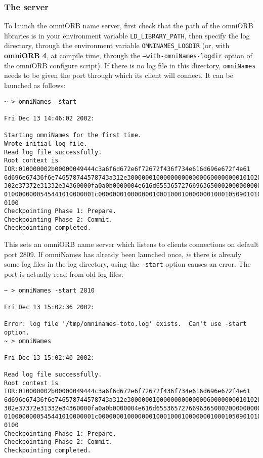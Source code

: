 \subsubsection{The server}

To launch the omniORB name server, first check that the path of the omniORB
libraries is in your environment variable \texttt{LD\_LIBRARY\_PATH}, then
specify the log directory, through the environment variable
\texttt{OMNINAMES\_LOGDIR} (or, with \textbf{omniORB 4}, at compile time,
through the \texttt{--with-omniNames-logdir} option of the omniORB configure
script). If there is no log file in this directory, \texttt{omniNames} needs to
be given the port through which its client will connect. It can be launched
as follows:
{\footnotesize
\begin{verbatim}
~ > omniNames -start

Fri Dec 13 14:46:02 2002:

Starting omniNames for the first time.
Wrote initial log file.
Read log file successfully.
Root context is IOR:010000002b00000049444c3a6f6d672e6f72672f436f734e616d696e672f4e61
6d696e67436f6e746578744578743a312e300000010000000000000060000000010102000d0000003134
302e37372e31332e34360000fa0a0b0000004e616d655365727669636500020000000000000008000000
0100000000545441010000001c0000000100000001000100010000000100010509010100010000000901
0100
Checkpointing Phase 1: Prepare.
Checkpointing Phase 2: Commit.
Checkpointing completed.
\end{verbatim}
}

This sets an omniORB name server which listens to clients
connections on default port 2809. If omniNames has already been launched once,
\emph{ie} there is already some log files in the log directory, using the
\texttt{-start} option causes an error. The port is actually read from old
log files:
{\footnotesize
\begin{verbatim}
~ > omniNames -start 2810

Fri Dec 13 15:02:36 2002:

Error: log file '/tmp/omninames-toto.log' exists.  Can't use -start option.
~ > omniNames  

Fri Dec 13 15:02:40 2002:

Read log file successfully.
Root context is IOR:010000002b00000049444c3a6f6d672e6f72672f436f734e616d696e672f4e61
6d696e67436f6e746578744578743a312e300000010000000000000060000000010102000d0000003134
302e37372e31332e34360000fa0a0b0000004e616d655365727669636500020000000000000008000000
0100000000545441010000001c0000000100000001000100010000000100010509010100010000000901
0100
Checkpointing Phase 1: Prepare.
Checkpointing Phase 2: Commit.
Checkpointing completed.
\end{verbatim}
}


